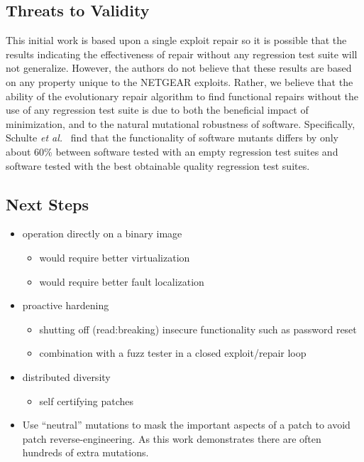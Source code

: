 \documentclass{sigcomm-alternate}
\begin{document}
\subsection{Threats to Validity}
\label{sec-6-1}
This initial work is based upon a single exploit repair so it is
possible that the results indicating the effectiveness of repair
without any regression test suite will not generalize.  However, the
authors do not believe that these results are based on any property
unique to the NETGEAR exploits. Rather, we believe that the ability of
the evolutionary repair algorithm to find functional repairs without
the use of any regression test suite is due to both the beneficial
impact of minimization, and to the natural mutational robustness of
software. Specifically, Schulte \emph{et al.}~\cite{schulte2013software} 
find that the functionality of software mutants differs by only about 60\%
between software tested with an empty regression test suites and software
tested with the best obtainable quality regression test suites.

\subsection{Next Steps}
\label{sec-6-2}

\begin{itemize}
\item operation directly on a binary image
\begin{itemize}
\item would require better virtualization
\item would require better fault localization
\end{itemize}
\item proactive hardening
\begin{itemize}
\item shutting off (read:breaking) insecure functionality such as
password reset
\item combination with a fuzz tester in a closed exploit/repair loop
\end{itemize}
\item distributed diversity
\begin{itemize}
\item self certifying patches
\end{itemize}
\item Use ``neutral'' mutations to mask the important aspects of a
  patch to avoid patch reverse-engineering.  As this work demonstrates
  there are often hundreds of extra mutations.
\end{itemize}
\end{document}
